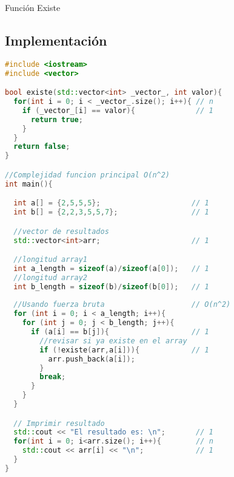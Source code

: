 \documentclass{article}
\begin{document}
\begin{center}
  \begin{minipage}{0.7\linewidth} %
    \begin{algorithm}[H] 
      \DontPrintSemicolon
      \caption{Función Existe}
      \label{alg:loop}
      \BlankLine
    \end{algorithm}
  \end{minipage}
\end{center}


\newpage
\subsection{Implementación}

\begin{file}
\begin{lstlisting}[language=C++]
#include <iostream>
#include <vector>

bool existe(std::vector<int> _vector_, int valor){
  for(int i = 0; i < _vector_.size(); i++){ // n
    if (_vector_[i] == valor){              // 1
      return true;
    }
  }
  return false;
}

//Complejidad funcion principal O(n^2)
int main(){

  int a[] = {2,5,5,5};                     // 1
  int b[] = {2,2,3,5,5,7};                 // 1

  //vector de resultados
  std::vector<int>arr;                     // 1

  //longitud array1
  int a_length = sizeof(a)/sizeof(a[0]);   // 1
  //longitud array2
  int b_length = sizeof(b)/sizeof(b[0]);   // 1
  
  //Usando fuerza bruta                    // O(n^2)
  for (int i = 0; i < a_length; i++){      
    for (int j = 0; j < b_length; j++){    
      if (a[i] == b[j]){                   // 1
        //revisar si ya existe en el array
        if (!existe(arr,a[i])){            // 1
          arr.push_back(a[i]);
        }
        break;
      }
    }
  }

  // Imprimir resultado
  std::cout << "El resultado es: \n";       // 1
  for(int i = 0; i<arr.size(); i++){        // n
    std::cout << arr[i] << "\n";            // 1
  } 
}
\end{lstlisting}
\end{file}
\end{document}
